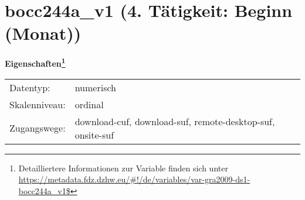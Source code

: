 
    \setcounter{footnote}{0}

    \vspace*{-1.8cm}
	\section{bocc244a\_v1 (4. Tätigkeit: Beginn (Monat))}
	\label{section:bocc244a_v1}



    \vspace*{0.5cm}
    \noindent\textbf{Eigenschaften\footnote{Detailliertere Informationen zur Variable finden sich unter
		\url{https://metadata.fdz.dzhw.eu/\#!/de/variables/var-gra2009-ds1-bocc244a_v1$}}}\\
	\begin{tabularx}{\hsize}{@{}lX}
	Datentyp: & numerisch \\
	Skalenniveau: & ordinal \\
	Zugangswege: &
	  download-cuf, 
	  download-suf, 
	  remote-desktop-suf, 
	  onsite-suf
 \\
    \end{tabularx}



